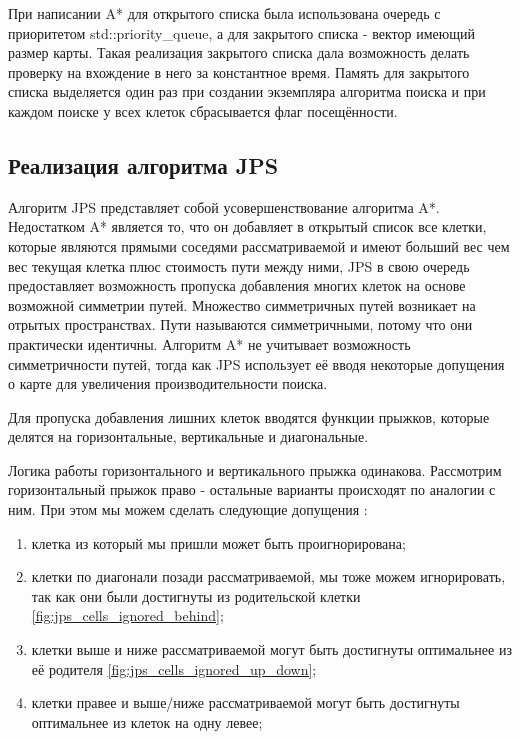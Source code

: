 

При написании A* для открытого списка была использована очередь с приоритетом std::priority\_queue, а для закрытого списка - вектор имеющий размер карты. Такая реализация закрытого списка дала возможность делать проверку на вхождение в него за константное время. Память для закрытого списка выделяется один раз при создании экземпляра алгоритма поиска и при каждом поиске у всех клеток сбрасывается флаг посещённости.

\subsection{Реализация алгоритма JPS}

Алгоритм JPS представляет собой усовершенствование алгоритма A*. Недостатком A* является то, что он добавляет в открытый список все клетки, которые являются прямыми соседями рассматриваемой и имеют больший вес чем вес текущая клетка плюс стоимость пути между ними, JPS в свою очередь предоставляет возможность пропуска добавления многих клеток на основе возможной симметрии путей. Множество симметричных путей возникает на отрытых пространствах. Пути называются симметричными, потому что они практически идентичны. Алгоритм A* не учитывает возможность симметричности путей, тогда как JPS использует её вводя некоторые допущения о карте для увеличения производительности поиска. 

Для пропуска добавления лишних клеток вводятся функции прыжков, которые делятся на горизонтальные, вертикальные и диагональные.

Логика работы горизонтального и вертикального прыжка одинакова. Рассмотрим горизонтальный прыжок право - остальные варианты происходят по аналогии с ним. При этом мы можем сделать следующие допущения \cite{JPS_DETAILS}:

\begin{enumerate}
    \item клетка из который мы пришли может быть проигнорирована;
    \item клетки по диагонали позади рассматриваемой, мы тоже можем игнорировать, так как они были достигнуты из родительской клетки \cref{fig:jps_cells_ignored_behind};
    \item клетки выше и ниже рассматриваемой могут быть достигнуты оптимальнее из её родителя \cref{fig:jps_cells_ignored_up_down};
    \item клетки правее и выше/ниже рассматриваемой могут быть достигнуты оптимальнее из клеток на одну левее;
\end{enumerate}


